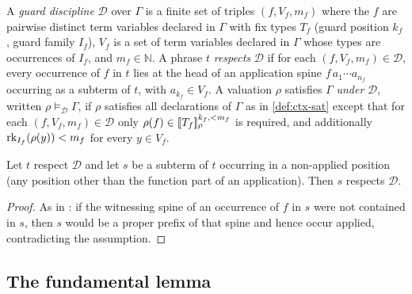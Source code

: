 \begin{definition}
\label{def:discipline}
A \emph{guard discipline} $\mathcal{D}$ over $\Gamma$ is a finite set of
triples $(f, V_f, m_f)$ where the $f$ are pairwise distinct term
variables declared in $\Gamma$ with fix types $T_f$ (guard position
$k_f$, guard family $I_f$), $V_f$ is a set of term variables declared in
$\Gamma$ whose types are occurrences of $I_f$, and $m_f \in \mathbb{N}$.
A phrase $t$ \emph{respects} $\mathcal{D}$ if for each $(f, V_f, m_f)
\in \mathcal{D}$, every occurrence of $f$ in $t$ lies at the head of an
application spine $f\,a_1 \cdots a_{n_f}$ occurring as a subterm of $t$,
with $a_{k_f} \in V_f$.  A valuation $\rho$ satisfies $\Gamma$
\emph{under} $\mathcal{D}$, written $\rho \vDash_{\mathcal{D}} \Gamma$,
if $\rho$ satisfies all declarations of $\Gamma$ as in
\cref{def:ctx-sat} except that for each $(f, V_f, m_f) \in \mathcal{D}$
only $\rho(f) \in [\![ T_f ]\!]_{\rho}^{k_f, < m_f}$ is required, and
additionally $\mathrm{rk}_{I_f}(\rho(y)) < m_f$ for every $y \in V_f$.
\end{definition}

\begin{lemma}
\label{lem:respect-local}
Let $t$ respect $\mathcal{D}$ and let $s$ be a subterm of $t$ occurring
in a non-applied position (any position other than the function part of
an application).  Then $s$ respects $\mathcal{D}$.
\end{lemma}

\begin{proof}
As in \cite{Extraction2026}: if the witnessing spine of an occurrence of
$f$ in $s$ were not contained in $s$, then $s$ would be a proper prefix
of that spine and hence occur applied, contradicting the assumption.
\end{proof}

\subsection{The fundamental lemma}
\label{sec:soundness-fundamental}


